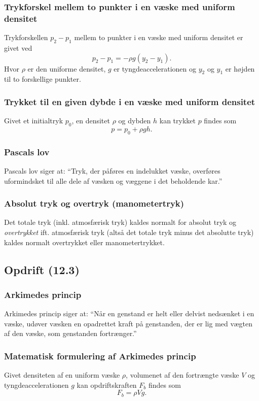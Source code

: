 \subsubsection{Trykforskel mellem to punkter i en væske med uniform densitet} \label{afs:trykfor}
Trykforskellen $p_2 - p_1$ mellem to punkter i en væske med uniform densitet er givet ved
\[ 
p_2 - p_1 = -\rho g(y_2 - y_1)
.\]
Hvor $\rho$ er den uniforme densitet, $g$ er tyngdeaccelerationen og $y_2$ og $y_1$ er højden til to forskellige punkter. 


\subsubsection{Trykket til en given dybde i en væske med uniform densitet} \label{afs:trykdyb}
Givet et initialtryk $p_0$, en densitet $\rho$ og dybden $h$ kan trykket $p$ findes som
\[ 
p = p_0 + \rho gh
.\]


\subsubsection{Pascals lov}
Pascals lov siger at: ``Tryk, der påføres en indelukket væske, overføres uformindsket til alle dele af væsken og væggene i det beholdende kar.''


\subsubsection{Absolut tryk og overtryk (manometertryk)}
Det totale tryk (inkl. atmosfærisk tryk) kaldes normalt for absolut tryk og \textit{overtrykket} ift. atmosfærisk tryk (altså det totale tryk minus det absolutte tryk) kaldes normalt overtrykket eller manometertrykket.


\subsection{Opdrift (12.3)}

\subsubsection{Arkimedes princip}
Arkimedes princip siger at: ``Når en genstand er helt eller delvist nedsænket i en væske, udøver væsken en opadrettet kraft på genstanden, der er lig med vægten af den væske, som genstanden fortrænger.''


\subsubsection{Matematisk formulering af Arkimedes princip} \label{afs:ark}
Givet densiteten af en uniform væske $\rho$, volumenet af den fortrængte væske $V$ og tyngdeaccelerationen $g$ kan opdriftskraften $F_{b}$ findes som
\[
F_b = \rho Vg
.\]

